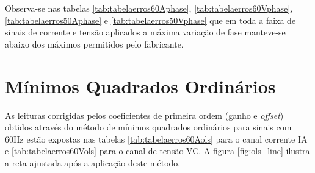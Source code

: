 \begin{table}[htb]
\end{table}

Observa-se nas tabelas \ref{tab:tabelaerros60Aphase}, \ref{tab:tabelaerros60Vphase}, \ref{tab:tabelaerros50Aphase} e \ref{tab:tabelaerros50Vphase} que em toda a faixa de sinais de corrente e tensão aplicados a máxima variação de fase manteve-se abaixo dos máximos permitidos pelo fabricante.

\newpage

\section{Mínimos Quadrados Ordinários}

As leituras corrigidas pelos coeficientes de primeira ordem (ganho e \textit{offset}) obtidos através do método de mínimos quadrados ordinários para sinais com 60Hz estão expostas nas tabelas \ref{tab:tabelaerros60Aols} para o canal corrente IA e \ref{tab:tabelaerros60Vols} para o canal de tensão VC. A figura \ref{fig:ols_line} ilustra a reta ajustada após a aplicação deste método.

